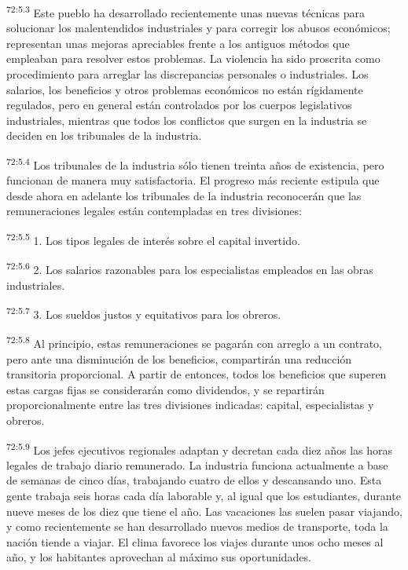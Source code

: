 \par
\textsuperscript{72:5.3} Este pueblo ha desarrollado recientemente unas nuevas técnicas para solucionar los malentendidos industriales y para corregir los abusos económicos; representan unas mejoras apreciables frente a los antiguos métodos que empleaban para resolver estos problemas. La violencia ha sido proscrita como procedimiento para arreglar las discrepancias personales o industriales. Los salarios, los beneficios y otros problemas económicos no están rígidamente regulados, pero en general están controlados por los cuerpos legislativos industriales, mientras que todos los conflictos que surgen en la industria se deciden en los tribunales de la industria.

\par
\textsuperscript{72:5.4} Los tribunales de la industria sólo tienen treinta años de existencia, pero funcionan de manera muy satisfactoria. El progreso más reciente estipula que desde ahora en adelante los tribunales de la industria reconocerán que las remuneraciones legales están contempladas en tres divisiones:

\par
\textsuperscript{72:5.5} 1. Los tipos legales de interés sobre el capital invertido.

\par
\textsuperscript{72:5.6} 2. Los salarios razonables para los especialistas empleados en las obras industriales.

\par
\textsuperscript{72:5.7} 3. Los sueldos justos y equitativos para los obreros.

\par
\textsuperscript{72:5.8} Al principio, estas remuneraciones se pagarán con arreglo a un contrato, pero ante una disminución de los beneficios, compartirán una reducción transitoria proporcional. A partir de entonces, todos los beneficios que superen estas cargas fijas se considerarán como dividendos, y se repartirán proporcionalmente entre las tres divisiones indicadas: capital, especialistas y obreros.

\par
\textsuperscript{72:5.9} Los jefes ejecutivos regionales adaptan y decretan cada diez años las horas legales de trabajo diario remunerado. La industria funciona actualmente a base de semanas de cinco días, trabajando cuatro de ellos y descansando uno. Esta gente trabaja seis horas cada día laborable y, al igual que los estudiantes, durante nueve meses de los diez que tiene el año. Las vacaciones las suelen pasar viajando, y como recientemente se han desarrollado nuevos medios de transporte, toda la nación tiende a viajar. El clima favorece los viajes durante unos ocho meses al año, y los habitantes aprovechan al máximo sus oportunidades.

